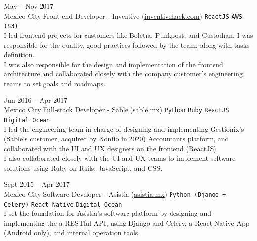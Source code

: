 \documentclass[9pt]{developercv} %
\begin{document}
\begin{entrylist}
    \entry
        {
            May -- Nov 2017
            \\\footnotesize{Mexico City}
        }
        {Front-end Developer - Inventive ({\href{https://www.linkedin.com/company/inventivehack/}{\underline{inventivehack.com}}})}
        { 
            \texttt{ReactJS}
            \slashsep\texttt{AWS (S3)}
        }
        {\\
            I led frontend projects for customers like Boletia, Punkpost, and Custodian. I was 
            responsible for the quality, good practices followed by the team, along with tasks 
            definition.\\
            
            I was also responsible for the design and implementation of the frontend architecture
            and collaborated closely with the company customer's engineering teams to set goals and 
            roadmaps.\\
        }

    \entry
        {
            Jun 2016 -- Apr 2017
            \\\footnotesize{Mexico City}
        }
        {Full-stack Developer - Sable ({\href{https://sable.mx/}{\underline{sable.mx}}})}
        {
            \texttt{Python}
            \slashsep\texttt{Ruby}
            \slashsep\texttt{ReactJS}
            \slashsep\texttt{Digital Ocean}
        }
        {\\
            I led the engineering team in charge of designing and implementing Gestionix's 
            (Sable's customer, acquired by Konfío in 2020) Accountants platform, and collaborated with 
            the UI and UX designers on the frontend (ReactJS).\\

            I also collaborated closely with the UI and UX teams to implement software solutions 
            using Ruby on Rails, JavaScript, and CSS.\\
        }

    \entry
        {
            Sept 2015 -- Apr 2017
            \\\footnotesize{Mexico City}
        }
        {Software Developer - Asistia ({\href{https://www.linkedin.com/company/asistia/}{\underline{asistia.mx}}})}
        {
            \texttt{Python (Django + Celery)}
            \slashsep\texttt{React Native}
            \slashsep\texttt{Digital Ocean}
        }
        {\\
            I set the foundation for Asistia's software platform by designing and implementing the a 
            RESTful API, using Django and Celery, a React Native App (Android only), and internal 
            operation tools.\\

}
\end{entrylist}
\end{document}
